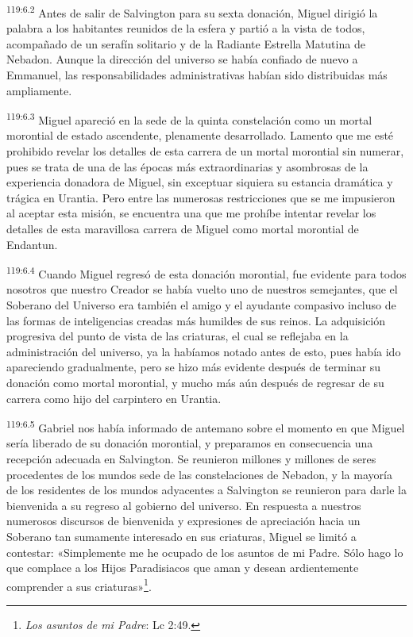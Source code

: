 \par
\textsuperscript{119:6.2} Antes de salir de Salvington para su sexta donación, Miguel dirigió la palabra a los habitantes reunidos de la esfera y partió a la vista de todos, acompañado de un serafín solitario y de la Radiante Estrella Matutina de Nebadon. Aunque la dirección del universo se había confiado de nuevo a Emmanuel, las responsabilidades administrativas habían sido distribuidas más ampliamente.

\par
\textsuperscript{119:6.3} Miguel apareció en la sede de la quinta constelación como un mortal morontial de estado ascendente, plenamente desarrollado. Lamento que me esté prohibido revelar los detalles de esta carrera de un mortal morontial sin numerar, pues se trata de una de las épocas más extraordinarias y asombrosas de la experiencia donadora de Miguel, sin exceptuar siquiera su estancia dramática y trágica en Urantia. Pero entre las numerosas restricciones que se me impusieron al aceptar esta misión, se encuentra una que me prohíbe intentar revelar los detalles de esta maravillosa carrera de Miguel como mortal morontial de Endantun.

\par
\textsuperscript{119:6.4} Cuando Miguel regresó de esta donación morontial, fue evidente para todos nosotros que nuestro Creador se había vuelto uno de nuestros semejantes, que el Soberano del Universo era también el amigo y el ayudante compasivo incluso de las formas de inteligencias creadas más humildes de sus reinos. La adquisición progresiva del punto de vista de las criaturas, el cual se reflejaba en la administración del universo, ya la habíamos notado antes de esto, pues había ido apareciendo gradualmente, pero se hizo más evidente después de terminar su donación como mortal morontial, y mucho más aún después de regresar de su carrera como hijo del carpintero en Urantia.

\par
\textsuperscript{119:6.5} Gabriel nos había informado de antemano sobre el momento en que Miguel sería liberado de su donación morontial, y preparamos en consecuencia una recepción adecuada en Salvington. Se reunieron millones y millones de seres procedentes de los mundos sede de las constelaciones de Nebadon, y la mayoría de los residentes de los mundos adyacentes a Salvington se reunieron para darle la bienvenida a su regreso al gobierno del universo. En respuesta a nuestros numerosos discursos de bienvenida y expresiones de apreciación hacia un Soberano tan sumamente interesado en sus criaturas, Miguel se limitó a contestar: «Simplemente me he ocupado de los asuntos de mi Padre. Sólo hago lo que complace a los Hijos Paradisiacos que aman y desean ardientemente comprender a sus criaturas»\footnote{\textit{Los asuntos de mi Padre}: Lc 2:49.}.

